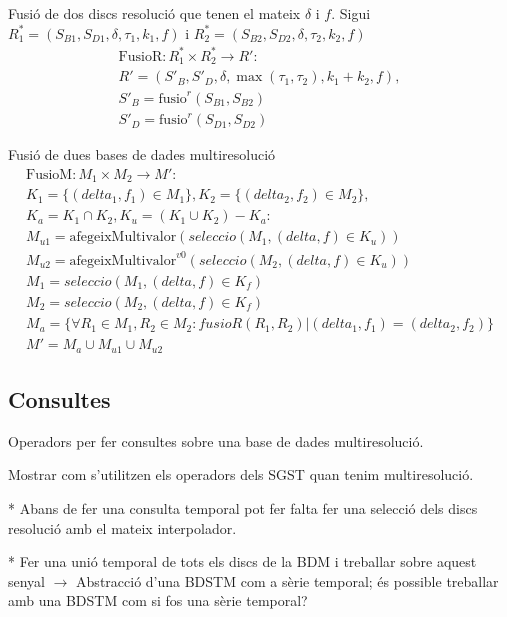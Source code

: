 Fusió de dos discs resolució que tenen el mateix $\delta$ i $f$.
Sigui $R_1^*=(S_{B1},S_{D1},\delta,\tau_1,k_1,f)$ i
$R_2^*=(S_{B2},S_{D2},\delta,\tau_2,k_2,f)$
  \begin{gather*}
    \text{FusioR}: R_1^* \times R_2^* \longrightarrow R': \\
    R' = (S'_B,S'_D,\delta,\max(\tau_1,\tau_2),k_1+k_2,f), \\
    S'_B = \text{fusio}^r(S_{B1},S_{B2})\\
    S'_D = \text{fusio}^r(S_{D1},S_{D2})
\end{gather*}


Fusió de dues bases de dades multiresolució
\begin{gather*}
    \text{FusioM}: M_1 \times M_2 \longrightarrow M': \\
    K_1 = \{(delta_1,f_1) \in M_1\},K_2 = \{(delta_2,f_2) \in M_2\}, \\
    K_a = K_1 \cap K_2, K_u =  (K_1 \cup K_2) - K_a : \\
    M_{u1} =\text{afegeixMultivalor}(seleccio(M_1, (delta,f) \in K_u))\\
    M_{u2} =\text{afegeixMultivalor}^{v0} (seleccio(M_2, (delta,f) \in K_u))\\
    M_1 = seleccio(M_1, (delta,f) \in K_f) \\
    M_2 = seleccio(M_2, (delta,f) \in K_f) \\
    M_a = \{\forall R_1\in M_1,R_2\in M_2: fusioR(R_1,R_2) |
       (delta_1,f_1) = (delta_2,f_2) \} \\
    M' =  M_{a} \cup  M_{u1}  \cup  M_{u2}     
\end{gather*}






\subsection{Consultes}



Operadors per fer consultes sobre una base de dades multiresolució. 

Mostrar com s'utilitzen els operadors dels SGST quan tenim multiresolució.


* Abans de fer una consulta temporal pot fer falta fer una selecció dels discs resolució amb el mateix interpolador.

* Fer una unió temporal de tots els discs de la BDM i treballar sobre aquest senyal $\longrightarrow$ Abstracció d'una BDSTM com a sèrie temporal; és possible treballar amb una BDSTM com si fos una sèrie temporal?

